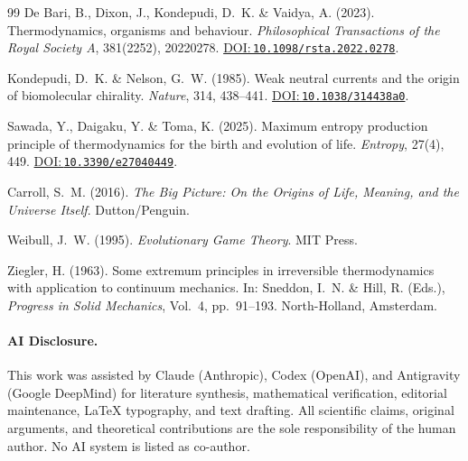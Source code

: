 \documentclass[12pt,a4paper]{article}
\newcommand{\doilink}[1]{\href{https://doi.org/#1}{DOI:\,\nolinkurl{#1}}}
\theoremstyle{remark}
\begin{document}
\begin{thebibliography}{99}
De Bari, B., Dixon, J., Kondepudi, D.~K. \& Vaidya, A. (2023).
\newblock Thermodynamics, organisms and behaviour.
\newblock \textit{Philosophical Transactions of the Royal Society A}, 381(2252), 20220278.
\newblock \doilink{10.1098/rsta.2022.0278}.

Kondepudi, D.~K. \& Nelson, G.~W. (1985).
\newblock Weak neutral currents and the origin of biomolecular chirality.
\newblock \textit{Nature}, 314, 438--441.
\newblock \doilink{10.1038/314438a0}.

Sawada, Y., Daigaku, Y. \& Toma, K. (2025).
\newblock Maximum entropy production principle of thermodynamics for the birth and evolution of life.
\newblock \textit{Entropy}, 27(4), 449.
\newblock \doilink{10.3390/e27040449}.

Carroll, S.~M. (2016).
\newblock \textit{The Big Picture: On the Origins of Life, Meaning, and the Universe Itself}.
\newblock Dutton/Penguin.

Weibull, J.~W. (1995).
\newblock \textit{Evolutionary Game Theory}.
\newblock MIT Press.

Ziegler, H. (1963).
\newblock Some extremum principles in irreversible thermodynamics with application to continuum mechanics.
\newblock In: Sneddon, I.~N. \& Hill, R. (Eds.), \textit{Progress in Solid Mechanics}, Vol.~4, pp.~91--193. North-Holland, Amsterdam.

\end{thebibliography}
\medskip
\paragraph*{AI Disclosure.} This work was assisted by Claude (Anthropic), Codex (OpenAI), and Antigravity (Google DeepMind) for literature synthesis, mathematical verification, editorial maintenance, LaTeX typography, and text drafting. All scientific claims, original arguments, and theoretical contributions are the sole responsibility of the human author. No AI system is listed as co-author.
\endgroup
\end{document}
